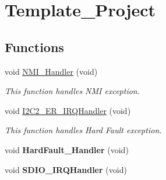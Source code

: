 \hypertarget{group___template___project}{
\section{Template\_\-Project}
\label{group___template___project}
}
\subsection*{Functions}
\begin{DoxyCompactItemize}
\item 
void \hyperlink{group___template___project_ga6ad7a5e3ee69cb6db6a6b9111ba898bc}{NMI\_\-Handler} (void)
\begin{DoxyCompactList}\small\item\em This function handles NMI exception. \end{DoxyCompactList}\item 
void \hyperlink{group___template___project_gaecd40b8012604ac4236bda3f65857c37}{I2C2\_\-ER\_\-IRQHandler} (void)
\begin{DoxyCompactList}\small\item\em This function handles Hard Fault exception. \end{DoxyCompactList}\item 
\hypertarget{group___template___project_ga2bffc10d5bd4106753b7c30e86903bea}{
void {\bfseries HardFault\_\-Handler} (void)}
\label{group___template___project_ga2bffc10d5bd4106753b7c30e86903bea}

\item 
\hypertarget{group___template___project_gadb3e01a3e924c7c52cad43949a43e9c7}{
void {\bfseries SDIO\_\-IRQHandler} (void)}
\label{group___template___project_gadb3e01a3e924c7c52cad43949a43e9c7}


\end{DoxyCompactItemize}
